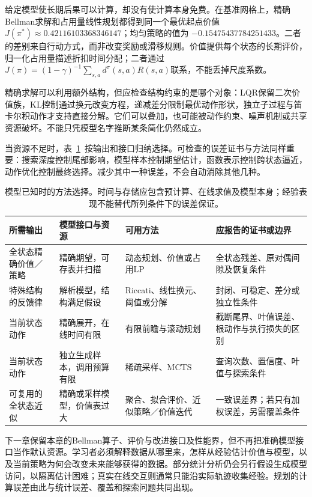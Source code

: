 给定模型使长期后果可以计算，却没有使计算本身免费。在基准网格上，精确Bellman求解和占用量线性规划都得到同一个最优起点价值
$J(\pi^*)\approx0.42116103368346147$；均匀策略的值为
$-0.15475437784251433$。二者的差别来自行动方式，而非改变奖励或滑移规则。价值提供每个状态的长期评价，归一化占用量描述折扣时间分配；二者通过
$J(\pi)=(1-\gamma)^{-1}\sum_{s,a}d^\pi(s,a)R(s,a)$联系，不能丢掉尺度系数。

精确求解可以利用额外结构，但应检查结构约束的是哪个对象：LQR保留二次价值族，KL控制通过换元改变方程，递减差分限制最优动作形状，独立子过程与笛卡尔积动作才支持直接分解。它们可以叠加，也可能被动作约束、噪声机制或共享资源破坏。不能只凭模型名字推断某条简化仍然成立。

当资源不足时，表~\ref{tab:rl-planning-method-choice}~按输出和接口归纳选择。可检查的误差证书与方法同样重要：搜索深度控制尾部影响，模型样本控制期望估计，函数表示控制跨状态逼近，动作优化控制最终选择。减少其中一种误差，不会自动消除其他几种。

\begin{table}[htbp]
 \centering
 \small
 \begin{tabularx}{\linewidth}{@{}l>{\raggedright\arraybackslash}X>{\raggedright\arraybackslash}X>{\raggedright\arraybackslash}X@{}}
  \toprule
  所需输出 & 模型接口与资源 & 可用方法 & 应报告的证书或边界\\
  \midrule
  全状态精确价值／策略 & 精确期望，可存表并扫描 & 动态规划、价值或占用LP & 全状态残差、原对偶间隙及恢复条件\\
  特殊结构的反馈律 & 解析模型，结构满足假设 & Riccati、线性换元、阈值或分解 & 封闭、可稳定、差分或独立性条件\\
  当前状态动作 & 精确展开，在线时间有限 & 有限前瞻与滚动规划 & 截断尾界、叶值误差、根动作与执行损失的区别\\
  当前状态动作 & 独立生成样本，调用预算有限 & 稀疏采样、MCTS & 查询次数、置信度、叶值与探索条件\\
  可复用的全状态近似 & 精确或采样模型，价值表过大 & 聚合、拟合评价、近似策略／价值迭代 & 一致误差界；若只有加权误差，另需覆盖条件\\
  \bottomrule
 \end{tabularx}
 \caption{模型已知时的方法选择。时间与存储应包含预计算、在线求值及模型本身；经验表现不能替代所列条件下的误差保证。}
 \label{tab:rl-planning-method-choice}
\end{table}

下一章保留本章的Bellman算子、评价与改进接口及性能界，但不再把准确模型接口当作默认资源。学习者必须解释数据从哪里来，怎样从经验估计价值与模型，以及当前策略为何会改变未来能够获得的数据。部分统计分析仍会另行假设生成模型访问，以隔离估计困难；真实在线交互则通常只能沿实际轨迹收集经验。规划的计算误差由此与统计误差、覆盖和探索问题共同出现。
